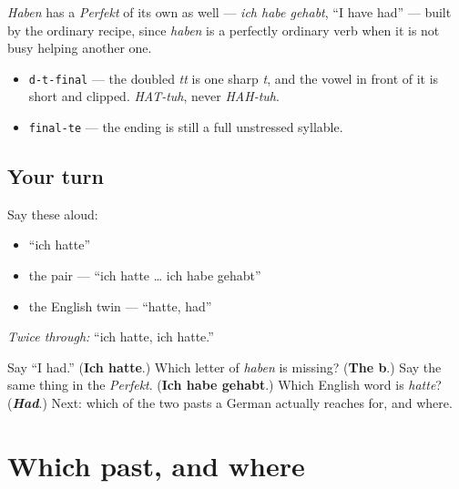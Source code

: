 \emph{Haben} has a \emph{Perfekt} of its own as well — \emph{ich habe gehabt}, \textquotedblleft{}I have had\textquotedblright{} — built by the ordinary recipe, since \emph{haben} is a perfectly ordinary verb when it is not busy helping another one.

\begin{sounds}
\begin{itemize}
\raggedright
  \item \texttt{d-t-final} — the doubled \emph{tt} is one sharp \emph{t}, and the vowel in front of it is short and clipped. \emph{HAT-tuh}, never \emph{HAH-tuh}.
  \item \texttt{final-te} — the ending is still a full unstressed syllable.
\end{itemize}
\end{sounds}

\subsection*{Your turn}
Say these aloud:

\begin{itemize}
\raggedright
  \item \textquotedblleft{}ich hatte\textquotedblright{}
  \item the pair — \textquotedblleft{}ich hatte … ich habe gehabt\textquotedblright{}
  \item the English twin — \textquotedblleft{}hatte, had\textquotedblright{}
\end{itemize}

\emph{Twice through:} \textquotedblleft{}ich hatte, ich hatte.\textquotedblright{}

\begin{tcolorbox}[breakable,colback=teal!4,colframe=teal!35!black,title={Before you move on}]
Say \textquotedblleft{}I had.\textquotedblright{} (\textbf{Ich hatte}.) Which letter of \emph{haben} is missing? (\textbf{The b}.) Say the same thing in the \emph{Perfekt}. (\textbf{Ich habe gehabt}.) Which English word is \emph{hatte}? (\emph{\textbf{Had}}.) Next: which of the two pasts a German actually reaches for, and where.
\end{tcolorbox}
\section[gesprochen oder geschrieben]{Which past, and where}

\label{lesson:GE-C15-register}



